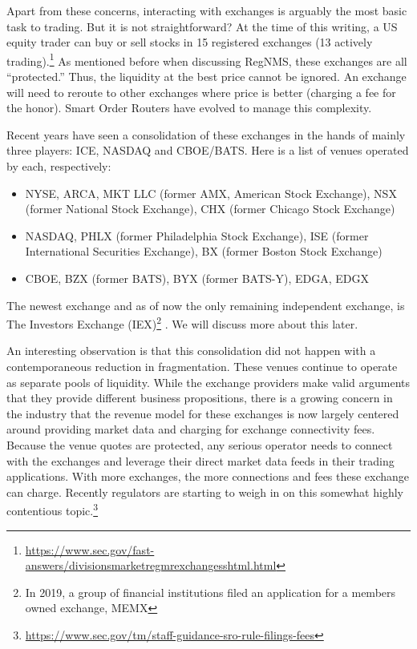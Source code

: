 Apart from these concerns, interacting with exchanges is arguably the most basic task to trading. But it is not straightforward? At the time of this writing, a US equity trader can buy or sell stocks in 15 registered exchanges (13 actively trading).\footnote{\url{https://www.sec.gov/fast-answers/divisionsmarketregmrexchangesshtml.html}} As mentioned before when discussing RegNMS, these exchanges are all ``protected.'' Thus, the liquidity at the best price cannot be ignored. An exchange will need to reroute to other exchanges where price is better (charging a fee for the honor). Smart Order Routers have evolved to manage this complexity.

Recent years have seen a consolidation of these exchanges in the hands of mainly three players: ICE, NASDAQ and CBOE/BATS. Here is a list of venues operated by each, respectively:
        \begin{itemize}
        \item NYSE, ARCA, MKT LLC (former AMX, American Stock Exchange), NSX (former National Stock Exchange), CHX (former Chicago Stock Exchange)
        \item NASDAQ, PHLX (former Philadelphia Stock Exchange), ISE (former International Securities Exchange), BX (former Boston Stock Exchange)
        \item CBOE, BZX (former BATS), BYX (former BATS-Y), EDGA, EDGX
        \end{itemize}
The newest exchange and as of now the only remaining independent exchange, is The Investors Exchange (IEX)\footnote{In 2019, a group of financial institutions filed an application for a members owned exchange, MEMX} . We will discuss more about this later.


An interesting observation is that this consolidation did not happen with a contemporaneous reduction in fragmentation. These venues continue to operate as separate pools of liquidity. While the exchange providers make valid arguments that they provide different business propositions, there is a growing concern in the industry that the revenue model for these exchanges is now largely centered around providing market data and charging for exchange connectivity fees. Because the venue quotes are protected, any serious operator needs to connect with the exchanges and leverage their direct market data feeds in their trading applications. With more exchanges, the more connections and fees these exchange can charge. Recently regulators are starting to weigh in on this somewhat highly contentious topic.\footnote{\url{https://www.sec.gov/tm/staff-guidance-sro-rule-filings-fees}}


